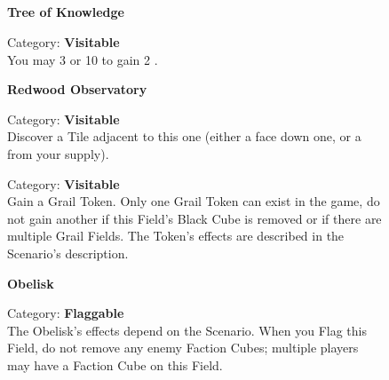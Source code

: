 \subsection*{}

\begin{figure}[H]
  \begin{minipage}[t]{0.47\textwidth}
    \vspace{0pt}
    \centering
    \textbf{Tree of Knowledge}\par
    \caption{\small Category: \textbf{Visitable}\\You may
       3  or
       10  to gain
       2 .}
  \end{minipage}\hfill
  \begin{minipage}[t]{0.47\textwidth}
    \vspace{0pt}
    \centering
    \textbf{Redwood Observatory}\par
    \caption{\small Category: \textbf{Visitable}\\Discover a Tile adjacent to this one (either a face down one, or a \protect{} from your supply).}
  \end{minipage}
\end{figure}

\begin{figure}[H]
  \begin{minipage}[t]{0.47\textwidth}
    \vspace{0pt}
    \centering
    \phantom{j}\textbf{}\par
    \caption{\small Category: \textbf{Visitable}\\Gain a Grail Token.
    Only one Grail Token can exist in the game, do not gain another if this Field's Black Cube is removed or if there are multiple Grail Fields.
    The Token's effects are described in the Scenario's description.
    \phantom{\ldots\ldots\ldots}}
  \end{minipage}\hfill
  \begin{minipage}[t]{0.47\textwidth}
    \vspace{0pt}
    \centering
    \phantom{j}\textbf{Obelisk}\par
    \caption{\small Category: \textbf{Flaggable}\\
      The Obelisk's effects depend on the Scenario.
      When you Flag this Field, do not remove any enemy Faction Cubes; multiple players may have a Faction Cube on this Field.}
  \end{minipage}
\end{figure}

